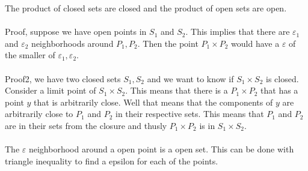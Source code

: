 \documentclass[12pt]{article}
\begin{document}
The product of closed sets are closed and the product of open sets are open. \\\\

Proof, suppose we have open points in $S_1$ and $S_2$. This implies that there are $\varepsilon_1$ and $\varepsilon_2$ neighborhoods around $P_1,P_2$. Then the point $P_1 \times P_2$ would have a $\varepsilon$ of the smaller of $\varepsilon_1, \varepsilon_2$.\\\\

Proof2, we have two closed sets $S_1,S_2$ and we want to know if $S_1 \times S_2$ is closed. 
Consider a limit point of $S_1 \times S_2$. This means that there is a $P_1 \times P_2$ that has a point $y$ that is arbitrarily close. Well that means that the components of $y$ are arbitrarily close to $P_1$ and $P_2$ in their respective sets. This means that $P_1$ and $P_2$ are in their sets from the closure and thusly $P_1 \times P_2$ is in $S_1 \times S_2$. 
\\\\
The $\varepsilon$ neighborhood around a open point is a open set. This can be done with triangle inequality to find a epsilon for each of the points. 
\end{document}
